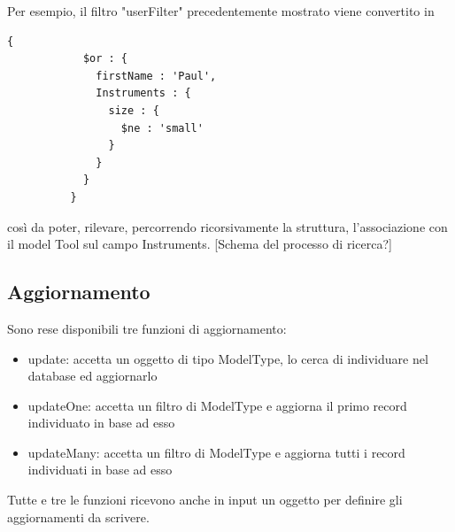 \documentclass[a4paper, 12pt]{scrartcl}
\begin{document}
        Per esempio, il filtro "userFilter" precedentemente mostrato viene convertito in
        \begin{Verbatim}[samepage=true]
          {
            $or : {
              firstName : 'Paul',
              Instruments : {
                size : {
                  $ne : 'small'
                }
              }
            }
          }
        \end{Verbatim}

        così da poter, rilevare, percorrendo ricorsivamente la struttura, l'associazione con il model Tool sul campo Instruments.
        [Schema del processo di ricerca?]

    \newpage
    \subsection*{Aggiornamento}
      Sono rese disponibili tre funzioni di aggiornamento: 
      \begin{itemize}
        \item update: accetta un oggetto di tipo ModelType, lo cerca di individuare nel database ed aggiornarlo
        \item updateOne: accetta un filtro di ModelType e aggiorna il primo record individuato in base ad esso
        \item updateMany: accetta un filtro di ModelType e aggiorna tutti i record individuati in base ad esso
      \end{itemize} 
      Tutte e tre le funzioni ricevono anche in input un oggetto per definire gli aggiornamenti da scrivere.
\end{document}
